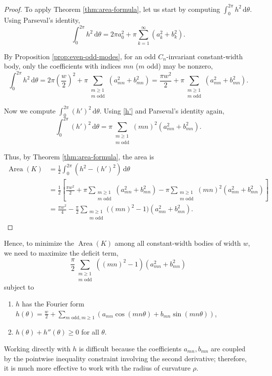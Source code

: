 \documentclass[11pt,letterpaper,reqno]{amsart}
\newcommand{\dd}{\,\mathrm{d}}
\begin{document}
\begin{proof}
  To apply Theorem \ref{thm:area-formula}, let us start by computing $\int_0^{2\pi}h^2\dd\theta$.
Using Parseval's identity,
\[
\int_0^{2\pi}h^2\dd\theta=2\pi a_0^2+\pi\sum_{k=1}^\infty(a_k^2+b_k^2).
\]

By Proposition \ref{prop:even-odd-modes}, for an odd $C_n$-invariant constant-width body, only the coefficients with indices $mn$ ($m$ odd) may be nonzero,
\[
\int_0^{2\pi}h^2\dd\theta
=2\pi\left(\frac{w}{2}\right)^2+\pi\sum_{\substack{m\ge1\\m\text{ odd}}}(a_{mn}^2+b_{mn}^2)
=\frac{\pi w^2}{2}+\pi\sum_{\substack{m\ge1\\m\text{ odd}}}(a_{mn}^2+b_{mn}^2).
\]

Now we compute $\int_0^{2\pi}(h')^2\dd\theta$. 
Using \eqref{h'} and Parseval's identity again,
\[
\int_0^{2\pi}(h')^2\dd\theta=\pi\sum_{\substack{m\ge1\\m\text{ odd}}}(mn)^2(a_{mn}^2+b_{mn}^2).
\]

Thus, by Theorem \ref{thm:area-formula}, the area is
\begin{align*}
\operatorname{Area}(K)&=\frac{1}{2}\int_0^{2\pi}(h^2-(h')^2)\dd\theta\\
&=\frac{1}{2}\left[\frac{\pi w^2}{2}+\pi\sum_{\substack{m\ge1\\m\text{ odd}}}(a_{mn}^2+b_{mn}^2)-\pi\sum_{\substack{m\ge1\\m\text{ odd}}}(mn)^2(a_{mn}^2+b_{mn}^2)\right]\\
&=\frac{\pi w^2}{4}-\frac{\pi}{2}\sum_{\substack{m\ge1\\m\text{ odd}}}\bigl((mn)^2-1\bigr)(a_{mn}^2+b_{mn}^2).
\end{align*}

\end{proof}


Hence, to minimize the $\operatorname{Area}(K)$ among all constant-width bodies of width $w$, we need to maximize the deficit term,
\[
\frac{\pi}{2} \sum_{\substack{m \ge 1\\m\text{ odd}}}((mn)^2-1)(a_{mn}^2+b_{mn}^2)
\]
subject to
\begin{enumerate}
\item $h$ has the Fourier form $h(\theta)=\frac{w}{2}+\sum_{m\text{ odd}, m\ge 1} (a_{mn}\cos (mn\theta)+b_{mn}\sin (mn\theta))$,
\item $h(\theta)+h''(\theta)\ge 0$ for all $\theta$.
\end{enumerate}
Working directly with $h$ is difficult because the coefficients $a_{mn}, b_{mn}$ are coupled by the pointwise inequality constraint involving the second derivative; therefore, it is much more effective to work with the radius of curvature $\rho$.
\end{document}
